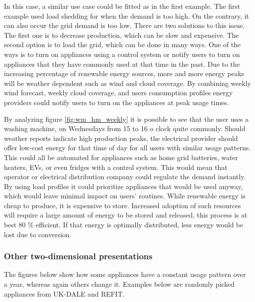In this case, a similar use case could be fitted as in the first example.
The first example used load shedding for when the demand is too high.
On the contrary, it can also occur the grid demand is too low.
There are two solutions to this issue.
The first one is to decrease production, which can be slow and expensive.
The second option is to load the grid, which can be done in many ways.
One of the ways is to turn on appliances using a control system or notify users to turn on appliances that they have commonly used at that time in the past. 
Due to the increasing percentage of renewable energy sources, more and more energy peaks will be weather dependent such as wind and cloud coverage.
By combining weekly wind forecast, weekly cloud coverage, and users consumption profiles energy providers could notify users to turn on the appliances at peak usage times.

By analyzing figure \ref{fig:wm_hm_weekly} it is possible to see that the user uses a washing machine,
on Wednesdays from  15 to 16 o clock quite commonly. 
Should weather reports indicate high production peaks, the electrical provider should offer low-cost energy for that time of day for all users with similar usage patterns. 
This could all be automated for appliances such as home grid batteries, water heaters, EVs, or even fridges with a control system.
This would mean that operator or electrical distribution company could regulate the demand instantly.
By using load profiles it could prioritize appliances that would be used anyway, which would leave minimal impact on users' routines. 
While renewable energy is cheap to produce, it is expensive to store.
Increased adoption of such resources will require a large amount of energy to be stored and released, this process is at best 80 \% efficient.
If that energy is optimally distributed, less energy would be lost due to conversion.

\subsubsection{Other two-dimensional presentations}

The figures below show how some appliances have a constant usage pattern 
over a year, whereas again others change it. Examples below are randomly picked appliances
from UK-DALE and REFIT. 

